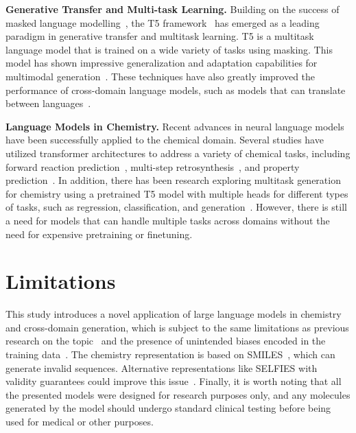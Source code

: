 \documentclass[nohyperref]{article}
\theoremstyle{plain}
\theoremstyle{definition}
\theoremstyle{remark}
\begin{document}
\textbf{Generative Transfer and Multi-task Learning.}
Building on the success of masked language modelling~\citep{devlin2018bert}, the T5 framework~\citep{raffel2020exploring} has emerged as a leading paradigm in generative transfer and multitask learning. T5 is a multitask language model that is trained on a wide variety of tasks using masking. This model has shown impressive generalization and adaptation capabilities for multimodal generation~\citep{saharia2022photorealistic}. 
These techniques have also greatly improved the performance of cross-domain language models, such as models that can translate between languages~\citep{sanh2021multitask}.

\textbf{Language Models in Chemistry.}
Recent advances in neural language models have been successfully applied to the chemical domain. Several studies have utilized transformer architectures to address a variety of chemical tasks, including forward reaction prediction~\citep{schwaller2019molecular}, multi-step retrosynthesis~\citep{schwaller2020predicting, toniato2021unassisted}, and property prediction~\citep{schwaller2021mapping, vaucher2020automated, born2022regression}.
In addition, there has been research exploring multitask generation for chemistry using a pretrained T5 model with multiple heads for different types of tasks, such as regression, classification, and generation~\citep{lu2022unified}.
However, there is still a need for models that can handle multiple tasks across domains without the need for expensive pretraining or finetuning. \label{section:conclusion}

\section{Limitations}
This study introduces a novel application of large language models in chemistry and cross-domain generation, which is subject to the same limitations as previous research on the topic~\cite {edwards2022translation} and the presence of unintended biases encoded in the training data~\cite{raffel2020exploring, liang2021towards}. The chemistry representation is based on SMILES~\cite{weininger1988smiles}, which can generate invalid sequences. Alternative representations like SELFIES with validity guarantees could improve this issue~\cite{krenn2020self}. 
Finally, it is worth noting that all the presented models were designed for research purposes only, and any molecules generated by the model should undergo standard clinical testing before being used for medical or other purposes.
\end{document}

